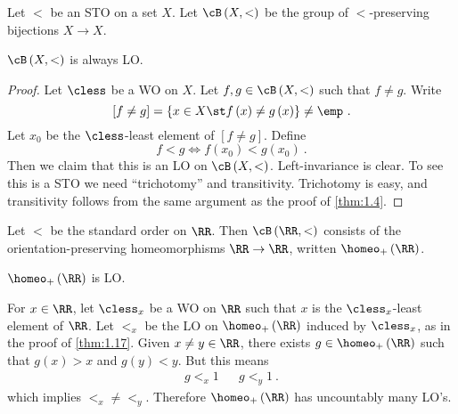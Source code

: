 
Let $<$ be an STO on a set $X$.
Let $\cB\left(X , <\right)$ be the group of $<$-preserving bijections $X\to X$.

\begin{thm}
$\cB\left(X, <\right)$ is always LO.
\label{thm:1.17}
\end{thm}

\begin{proof}
Let $\cless$ be a WO on $X$.
Let $f , g\in \cB\left(X , <\right)$ such that $f\neq g$. 
Write 
\begin{equation}
\left[f\neq g\right] = \left\{x\in X \st f\left(x\right)\neq g\left(x\right)\right\}\neq
\emp
\ .
\end{equation}
Let $x_0$ be the $\cless$-least element of $\left[f\neq g\right]$.
Define
\begin{equation}
f < g \iff f\left(x_0\right) < g\left(x_0\right) \ .
\end{equation}
Then we claim that this is an LO on $\cB\left(X , <\right)$.
Left-invariance is clear. To see this is a STO we need ``trichotomy''
and transitivity. Trichotomy is easy, and transitivity follows from the same argument as
the proof of \cref{thm:1.4}.
\end{proof}

\begin{exm}
Let $<$ be the standard order on $\RR$.
Then $\cB\left(\RR , <\right)$ consists of the orientation-preserving homeomorphisms $\RR
\to \RR$, written $\homeo_+\left(\RR\right)$.
\end{exm}

\begin{cor}
$\homeo_+\left(\RR\right)$ is LO.
\label{cor:1.18}
\end{cor}

\begin{rmk}
For $x\in \RR$, let $\cless_x$ be a WO on $\RR$ such that $x$ is the $\cless_x$-least
element of $\RR$.
Let $<_x$ be the LO on $\homeo_+\left(\RR\right)$ induced by $\cless_x$, as in the proof
of \cref{thm:1.17}. Given $x\neq y\in \RR$, there exists $g\in \homeo_+\left(\RR\right)$
such that
$g\left(x\right) > x$ and $g\left(y\right) < y$. But this means
\begin{align*}
g<_x 1 && g<_y 1
\ .
\end{align*}
which implies $<_x\neq <_y$.
Therefore $\homeo_+\left(\RR\right)$ has uncountably many LO's.
\end{rmk}

